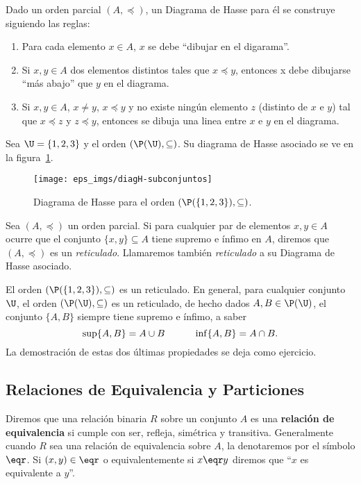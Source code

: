 \begin{definicion}
Dado un orden parcial $(A,\preceq)$, un Diagrama de Hasse para él se construye siguiendo las reglas:
\begin{enumerate}
  \itemsep 0pt
  \item Para cada elemento $x\in A$, $x$ se debe ``dibujar en el digarama''.
  \item Si $x,y\in A$ dos elementos distintos tales que $x\preceq y$, entonces x debe dibujarse ``más abajo'' que $y$ en el diagrama.
  \item Si $x,y\in A$, $x\not=y$, $x\preceq y$ y no existe ningún elemento $z$ (distinto de $x$ e $y$) tal que $x\preceq z$ y $z\preceq y$, entonces se dibuja una linea entre $x$ e $y$ en el diagrama.
\end{enumerate}
\end{definicion}

\begin{ejemplo}
Sea $\U=\{1,2,3\}$ y el orden $(\P(\U),\subseteq)$.
Su diagrama de Hasse asociado se ve en la figura~\ref{fig:diagH-subconjuntos}.

\begin{figure}[h!]
\centering
\texttt{[image: eps\_imgs/diagH-subconjuntos]}
\caption{Diagrama de Hasse para el orden $(\P(\{1,2,3\}),\subseteq)$.}
\label{fig:diagH-subconjuntos}
\end{figure}
\end{ejemplo}

\begin{definicion}
Sea $(A,\preceq)$ un orden parcial.
Si para cualquier par de elementos $x,y\in A$ ocurre que el conjunto $\{x,y\}\subseteq A$ tiene supremo e ínfimo en $A$, diremos que $(A,\preceq)$ es un \emph{reticulado}.
Llamaremos también \emph{reticulado} a su Diagrama de Hasse asociado.
\end{definicion}

\begin{ejemplo}
El orden $(\P(\{1,2,3\}),\subseteq)$ es un reticulado.
En general, para cualquier conjunto $\U$, el orden $(\P(\U),\subseteq)$ es un reticulado,
de hecho dados $A,B\in\P(\U)$, el conjunto $\{A,B\}$ siempre tiene supremo e ínfimo, a saber \[\sup\{A,B\}=A\cup B \hspace*{3em} \inf\{A,B\}=A\cap B.\]
La demostración de estas dos últimas propiedades se deja como ejercicio.
\end{ejemplo}


\subsection{Relaciones de Equivalencia y Particiones}
\begin{definicion}
Diremos que una relación binaria $R$ sobre un conjunto $A$ es una {\bf relación de equivalencia} si cumple con ser, refleja, simétrica y transitiva.
Generalmente cuando $R$ sea una relación de equivalencia sobre $A$, la denotaremos por el símbolo $\eqr$.
Si $(x,y)\in\eqr$ o equivalentemente si $x\eqr y$ diremos que ``$x$ es equivalente a $y$''.
\end{definicion}

